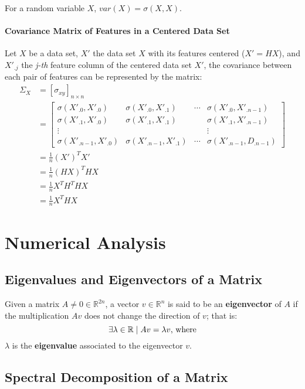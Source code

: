 \begin{remark}
	For a random variable $X$, $var(X) = \sigma(X, X)$.
\end{remark}

\paragraph{Covariance Matrix of Features in a Centered Data Set}

Let $X$ be a data set, $X'$ the data set $X$ with its features centered ($X'=HX$), and $X'_{.j}$ the {\em j-th} feature column of the centered data set $X'$, the covariance between each pair of features can be represented by the matrix:
\begin{align*}
\Sigma_X &= [\sigma_{xy}]_{n \times n} \\
&= \begin{bmatrix}
\sigma(X'_{.0}, X'_{.0}) & \sigma(X'_{.0}, X'_{.1}) & \cdots & \sigma(X'_{.0}, X'_{.n-1}) \\
\sigma(X'_{.1}, X'_{.0}) & \sigma(X'_{.1}, X'_{.1}) & & \sigma(X'_{.1}, X'_{.n-1}) \\
\vdots &&& \vdots \\
\sigma(X'_{.n-1}, X'_{.0}) & \sigma(X'_{.n-1}, X'_{.1}) & \cdots & \sigma(X'_{.n-1}, D_{.n-1})
\end{bmatrix} \\
&= \frac{1}{n} (X')^T X' \\
&= \frac{1}{n} (HX)^T HX \\
&= \frac{1}{n} X^T H^T H X \\
 &= \frac{1}{n} X^T H X
\end{align*}

\section{Numerical Analysis}
\subsection{Eigenvalues and Eigenvectors of a Matrix}

Given a matrix $A \ne 0 \in \mathbb{R}^{2n}$, a vector $v \in \mathbb{R}^n$ is said to be an \textbf{eigenvector} of $A$ if the multiplication $Av$ does not change the direction of $v$; that is:
$$\exists \lambda \in \mathbb{R} \mid Av = \lambda v \textnormal{, where}$$
$\lambda$ is the \textbf{eigenvalue} associated to the eigenvector $v$.

\subsection{Spectral Decomposition of a Matrix}

